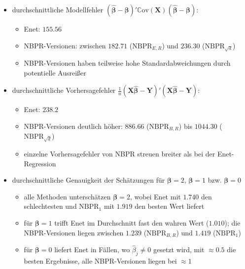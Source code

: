 \documentclass{beamer}
\begin{document}
\begin{frame}
	\begin{itemize}
	\item durchschnittliche Modellfehler $(\boldsymbol{\hat{\beta}}- \boldsymbol{\beta})'\mathbb{C}\text{ov}(\mathbf{X})(\boldsymbol{\hat{\beta}}- \boldsymbol{\beta})$:
	\begin{itemize}
	\item Enet: $155.56$
	\item NBPR-Versionen: zwischen $182.71$ ($\text{NBPR}_{E,R}$) und $236.30$ ($\text{NBPR}_{\sqrt{d}}$)
	\item NBPR-Versionen haben teilweise hohe Standardabweichungen durch potentielle Ausreißer
	\end{itemize}
	\item durchschnittliche Vorhersagefehler $\frac{1}{n}(\mathbf{X}\boldsymbol{\hat{\beta}}- \mathbf{Y})'(\mathbf{X}\boldsymbol{\hat{\beta}}- \mathbf{Y})$:
	\begin{itemize}
	\item Enet: $238.2$
	\item NBPR-Versionen deutlich höher: $886.66$ ($\text{NBPR}_{B,R}$) bis $1044.30$ ($\text{NBPR}_{\sqrt{d}}$)
	\item einzelne Vorhersagefehler von NBPR streuen breiter als bei der Enet-Regression 
	\end{itemize}
	\end{itemize}
\end{frame}


\begin{frame}
	\begin{itemize}
	\item durchschnittliche Genauigkeit der Schätzungen für $\boldsymbol{\beta} = 2$, $\boldsymbol{\beta} = 1$ bzw. $\boldsymbol{\beta} = 0$
	\begin{itemize}
	\item alle Methoden unterschätzen $\boldsymbol{\beta}=2$, wobei Enet mit $1.740$ den schlechtesten und $\text{NBPR}_1$ mit $1.919$ den besten Wert liefert
	\item für $\boldsymbol{\beta} = 1$ trifft Enet im Durchschnitt fast den wahren Wert ($1.010$); die NBPR-Versionen liegen zwischen $1.239$ ($\text{NBPR}_{B,R}$) und $1.419$ ($\text{NBPR}_1$)  
	\item für $\boldsymbol{\beta}= 0$ liefert Enet in Fällen, wo $\hat{\beta}_j \neq 0$ gesetzt wird, mit $\approx0.5$ die besten Ergebnisse, alle NBPR-Versionen liegen bei $\approx 1$
	\end{itemize}
	\end{itemize}
\end{frame}
\end{document}
